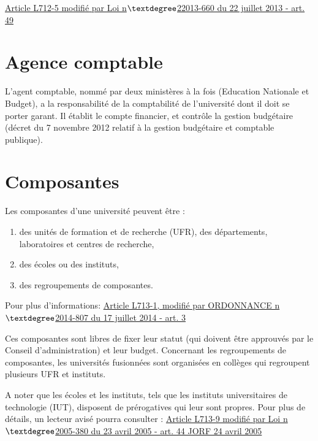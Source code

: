 \href{https://www.legifrance.gouv.fr/affichCodeArticle.do;jsessionid=C8BFF801F2976E9272297AB33338C553.tpdila14v_3?idArticle=LEGIARTI000027747971&cidTexte=LEGITEXT000006071191&dateTexte=20170113}{Article L712-5   modifi{\'e} par Loi n$\textdegree$22013-660 du 22 juillet 2013 - art. 49}

\section{Agence comptable}
L'agent comptable, nomm\'e par deux minist\`eres \`a la fois (Education Nationale et Budget), a la responsabilit\'e de la comptabilit\'e de l'universit\'e dont il doit se porter garant. Il \'etablit le compte financier, et contr\^ole la gestion budg\'etaire (d{\'e}cret du 7 novembre 2012 relatif {\`a} la gestion budg{\'e}taire et comptable publique).


\section{Composantes}
Les composantes d'une universit\'e peuvent \^etre :
\begin{enumerate}
 \item des unit\'es de formation et de recherche (UFR), des d\'epartements, laboratoires et centres de recherche,
 \item des \'ecoles ou des instituts,
 \item des regroupements de composantes.
\end{enumerate}

Pour plus d'informations: 
\href{https://www.legifrance.gouv.fr/affichCode.do;jsessionid=6C65A5741617DEF72E5BAC5710E2EE64.tpdila20v_1?idSectionTA=LEGISCTA000006166682&cidTexte=LEGITEXT000006071191&dateTexte=20170114}{Article L713-1, modifi\'e par ORDONNANCE n$\textdegree$2014-807 du 17 juillet 2014 - art. 3} 

Ces composantes sont libres de fixer leur statut (qui doivent \^etre approuv\'es par le Conseil d'administration) et leur budget. 
Concernant les regroupements de composantes, les universit\'es fusionn\'ees sont organis\'ees en coll\`eges qui regroupent plusieurs UFR et instituts. 

A noter que les \'ecoles et les instituts, tels que les instituts universitaires de technologie (IUT), 
disposent de pr\'erogatives qui leur sont propres. Pour plus de d\'etails, un lecteur avis\'e pourra consulter :
\href{https://www.legifrance.gouv.fr/affichCode.do;jsessionid=6C65A5741617DEF72E5BAC5710E2EE64.tpdila20v_1?idSectionTA=LEGISCTA000006182446&cidTexte=LEGITEXT000006071191&dateTexte=20170114}{Article L713-9 modifi\'e par Loi n$\textdegree$2005-380 du 23 avril 2005 - art. 44 JORF 24 avril 2005}

